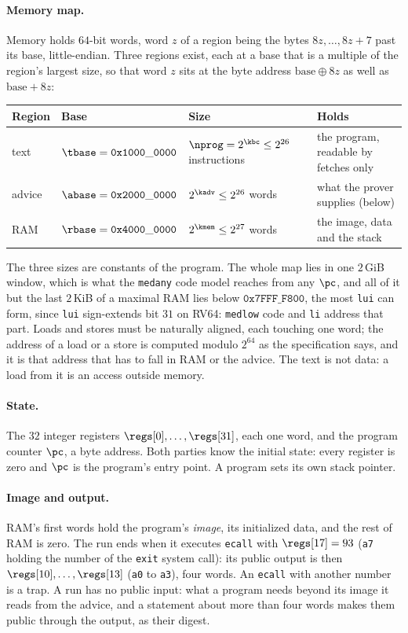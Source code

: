 \paragraph{Memory map.} Memory holds $64$-bit words, word $z$ of a region being the bytes $8z,\dots,8z+7$ past its base, little-endian. Three regions exist, each at a base that is a multiple of the region's largest size, so that word $z$ sits at the byte address $\mathrm{base}\oplus 8z$ as well as $\mathrm{base}+8z$:
\begin{center}
\begin{tabularx}{\textwidth}{@{}lllX@{}}
\hline
Region & Base & Size & Holds\\
\hline
text   & $\tbase=\mathtt{0x1000\_0000}$ & $\nprog=2^{\kbc}\le2^{26}$ instructions & the program, readable by fetches only\\
advice & $\abase=\mathtt{0x2000\_0000}$ & $2^{\kadv}\le2^{26}$ words & what the prover supplies (below)\\
RAM    & $\rbase=\mathtt{0x4000\_0000}$ & $2^{\kmem}\le2^{27}$ words & the image, data and the stack\\
\hline
\end{tabularx}
\end{center}
The three sizes are constants of the program. The whole map lies in one $2$\,GiB window, which is what the \texttt{medany} code model reaches from any $\pc$, and all of it but the last $2$\,KiB of a maximal RAM lies below $\mathtt{0x7FFF\_F800}$, the most \texttt{lui} can form, since \texttt{lui} sign-extends bit $31$ on RV64: \texttt{medlow} code and \texttt{li} address that part. Loads and stores must be naturally aligned, each touching one word; the address of a load or a store is computed modulo $2^{64}$ as the specification says, and it is that address that has to fall in RAM or the advice. The text is not data: a load from it is an access outside memory.

\paragraph{State.} The $32$ integer registers $\regs[0],\dots,\regs[31]$, each one word, and the program counter $\pc$, a byte address. Both parties know the initial state: every register is zero and $\pc$ is the program's entry point. A program sets its own stack pointer.

\paragraph{Image and output.} RAM's first words hold the program's \emph{image}, its initialized data, and the rest of RAM is zero. The run ends when it executes \texttt{ecall} with $\regs[17]=93$ (\texttt{a7} holding the number of the \texttt{exit} system call): its public output is then $\regs[10],\dots,\regs[13]$ (\texttt{a0} to \texttt{a3}), four words. An \texttt{ecall} with another number is a trap. A run has no public input: what a program needs beyond its image it reads from the advice, and a statement about more than four words makes them public through the output, as their digest.

